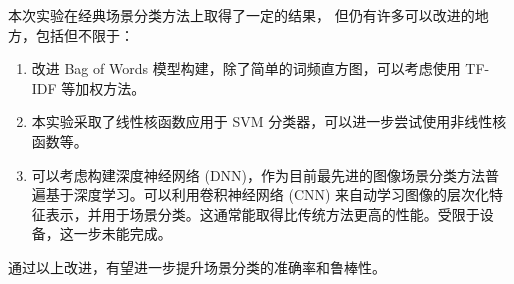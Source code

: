 本次实验在经典场景分类方法上取得了一定的结果，
但仍有许多可以改进的地方，包括但不限于：

\begin{enumerate}
\item 改进 Bag of Words 模型构建，除了简单的词频直方图，可以考虑使用 TF-IDF 等加权方法。

\item 本实验采取了线性核函数应用于 SVM 分类器，可以进一步尝试使用非线性核函数等。

\item 可以考虑构建深度神经网络 (DNN)，作为目前最先进的图像场景分类方法普遍基于深度学习。可以利用卷积神经网络 (CNN) 来自动学习图像的层次化特征表示，并用于场景分类。这通常能取得比传统方法更高的性能。受限于设备，这一步未能完成。
\end{enumerate}

通过以上改进，有望进一步提升场景分类的准确率和鲁棒性。
